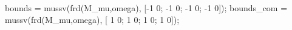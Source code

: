 bounds     = mussv(frd(M_mu,omega), [-1 0; -1 0; -1 0; -1 0]); %
bounds_com = mussv(frd(M_mu,omega), [ 1 0;  1 0;  1 0;  1 0]); %